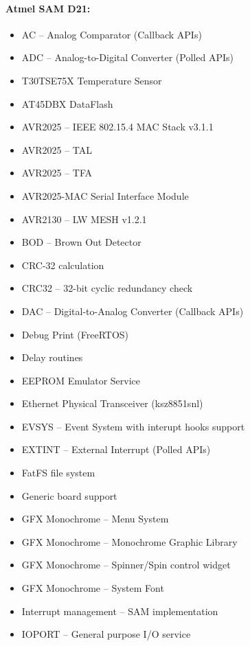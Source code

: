 \paragraph{Atmel SAM D21:} \cite{AtmelSAMd20API}
\begin{multicols}{2}
	\begin{flushleft}
		\begin{itemize}
			\setlength\itemsep{1pt}
			\item AC -- Analog Comparator (Callback APIs)
			\item ADC -- Analog-to-Digital Converter (Polled APIs)
			\item T30TSE75X Temperature Sensor
			\item AT45DBX DataFlash
			\item AVR2025 -- IEEE 802.15.4 MAC Stack v3.1.1
			\item AVR2025 -- TAL
			\item AVR2025 -- TFA
			\item AVR2025-MAC Serial Interface Module
			\item AVR2130 -- LW MESH v1.2.1
			\item BOD -- Brown Out Detector
			\item CRC-32 calculation
			\item CRC32 -- 32-bit cyclic redundancy check
			\item DAC -- Digital-to-Analog Converter (Callback APIs)
			\item Debug Print (FreeRTOS)
			\item Delay routines
			\item EEPROM Emulator Service
			\item Ethernet Physical Transceiver (ksz8851snl)
			\item EVSYS -- Event System with interupt hooks support
			\item EXTINT -- External Interrupt (Polled APIs)
			\item FatFS file system
			\item Generic board support
			\item GFX Monochrome -- Menu System
			\item GFX Monochrome -- Monochrome Graphic Library
			\item GFX Monochrome -- Spinner/Spin control widget
			\item GFX Monochrome -- System Font
			\item Interrupt management -- SAM implementation
			\item IOPORT -- General purpose I/O service

\end{itemize}
\end{flushleft}
\end{multicols}
